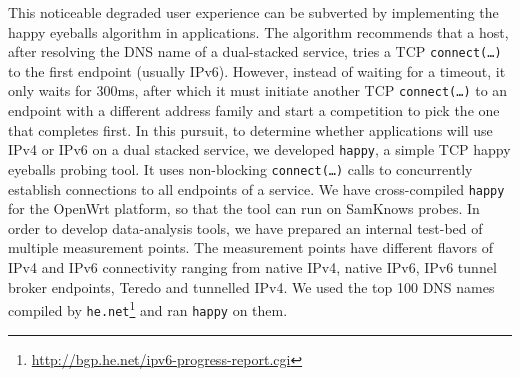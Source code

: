 This noticeable degraded user experience can be subverted by implementing the
happy eyeballs algorithm \cite{rfc6555} in applications. The algorithm
recommends that a host, after resolving the DNS name of a dual-stacked
service, tries a TCP \texttt{connect(\ldots)} to the first endpoint (usually
IPv6). However, instead of waiting for a timeout, it only waits for 300ms,
after which it must initiate another TCP \texttt{connect(\ldots)} to an
endpoint with a different address family and start a competition to pick the
one that completes first.  In this pursuit, to determine whether applications
will use IPv4 or IPv6 on a dual stacked service, we developed \texttt{happy},
a simple TCP happy eyeballs probing tool. It uses non-blocking
\texttt{connect(\ldots)} calls to concurrently establish connections to all
endpoints of a service.  We have cross-compiled \texttt{happy} for the OpenWrt
platform, so that the tool can run on SamKnows probes. In order to develop
data-analysis tools, we have prepared an internal test-bed of multiple
measurement points. The measurement points have different flavors of IPv4 and
IPv6 connectivity ranging from native IPv4, native IPv6, IPv6 tunnel broker
endpoints, Teredo and tunnelled IPv4. We used the top 100 DNS names compiled
by \texttt{he.net}\footnote{\url{http://bgp.he.net/ipv6-progress-report.cgi}}
and ran \texttt{happy} on them.

